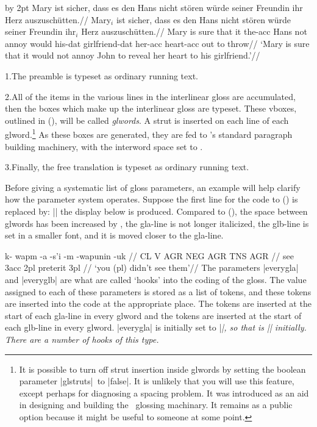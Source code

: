 \begingroup
\advance\hsize by 2pt
\framedisplay %
\boxglwords
\ex[glspace=1.2em,extraglskip=1ex,belowpreambleskip=2ex,aboveglftskip=2ex]
\begingl
\glpreamble Mary ist sicher, dass es den Hans nicht st\"oren w\"urde
seiner Freundin ihr Herz auszusch\"utten.//
\gla Mary$_i$ ist sicher, dass es den Hans nicht st\"oren w\"urde
seiner Freundin ihr$_i$ Herz auszusch\"utten.//
\glb Mary is sure that it the-{\sc acc} Hans not annoy would
his-{\sc dat} girlfriend-{\sc dat} her-{\sc acc} heart-{\sc acc} {out to
throw}//
\glft  `Mary is sure that it would not annoy John to reveal her
heart to his girlfriend.'//
\endgl
\xe
\endframedisplay
\endgroup

\smallskip
\item{1.}The preamble is typeset as ordinary running text.
\item{2.}All of the items in the various lines in the interlinear gloss are
accumulated, then the boxes which make up the interlinear gloss are
typeset.  These vboxes, outlined in (\lastx), will be called {\it
glwords}. A strut is inserted on each line of each glword.\footnote{It
is possible to turn off strut insertion inside glwords by setting the
boolean parameter |glstruts|\ to |false|.
It is unlikely that you will use this feature, except perhaps for
diagnosing a spacing problem.  It was introduced as an aid in
designing and building the \ExPex\ glossing machinary.  It remains
as a public option because it might be useful to someone at some
point.} As these boxes are generated, they are fed to \Tex's standard
paragraph building machinery, with the interword space set to
. \item{3.}Finally, the free translation is typeset
as ordinary running text.
\medskip

Before giving a systematic list of gloss parameters, an example
will help clarify how the parameter system operates.  Suppose the
first line for the code to () is replaced by:
\medskip
\noindent |\ex[glspace=!1em,everygla={},everyglb=\footnotesize,aboveglbskip=-.2ex]|
\medskip
\noindent the display below is produced.  Compared to
(), the space between glwords has been increased by
\textdim{1 em}, the gla-line is not longer italicized, the glb-line is
set in a smaller font, and it is moved closer to the gla-line.

\framedisplay
{}
\begingl
\gla k- wapm -a -s'i -m -wapunin -uk //
\glb CL V AGR NEG AGR TNS AGR //
 see {\sc 3acc} {} {\sc 2pl} preterit {\sc 3pl} //
\glft `you (pl) didn't see them'//
\endgl
\xe
\endframedisplay
The parameters |everygla| and |everyglb| are what are called `hooks'
into the coding of the gloss.  The value assigned to each of these
parameters is stored as a list of tokens, and these tokens are
inserted into the code at the appropriate place.  The tokens
 are inserted at the start of each gla-line in
every glword and the tokens  are inserted at the
start of each glb-line in every glword.  |everygla| is initially set
to |\it|, so that  is |{\it}| initially.  There are a
number of hooks of this type.

